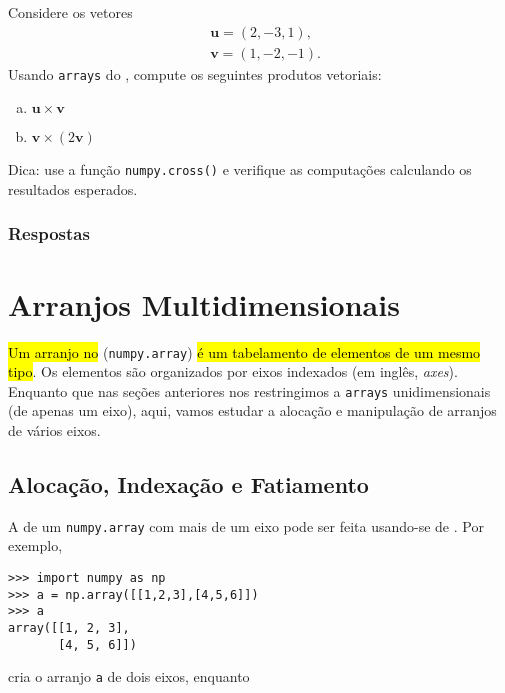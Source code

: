 \begin{exer}
  Considere os vetores
  \begin{align}
    &\pmb{u} = (2, -3, 1),\\
    &\pmb{v} = (1, -2, -1).
  \end{align}
  Usando \lstinline+arrays+ do {\numpy}, compute os seguintes produtos vetoriais:
  \begin{enumerate}[a)]
  \item $\pmb{u}\times\pmb{v}$
  \item $\pmb{v}\times (2\pmb{v})$
  \end{enumerate}
\end{exer}
\begin{resp}
  Dica: use a função \lstinline+numpy.cross()+ e verifique as computações calculando os resultados esperados.
\end{resp}

\ifisbook
\subsubsection{Respostas}
\shipoutAnswer
\fi


\section{Arranjos Multidimensionais}\label{cap_arr_sec_multi}

\hl{Um arranjo no {\numpy}} (\lstinline+numpy.array+) \hl{é um tabelamento de elementos de um mesmo tipo}. Os elementos são organizados por eixos indexados (em inglês, \textit{axes}). Enquanto que nas seções anteriores nos restringimos a \lstinline+arrays+ unidimensionais (de apenas um eixo), aqui, vamos estudar a alocação e manipulação de arranjos de vários eixos.

\subsection{Alocação, Indexação e Fatiamento}

A  de um \lstinline+numpy.array+ com mais de um eixo pode ser feita usando-se de . Por exemplo,

\begin{lstlisting}
>>> import numpy as np
>>> a = np.array([[1,2,3],[4,5,6]])
>>> a
array([[1, 2, 3],
       [4, 5, 6]])
\end{lstlisting}

cria o arranjo \lstinline+a+ de dois eixos, enquanto

